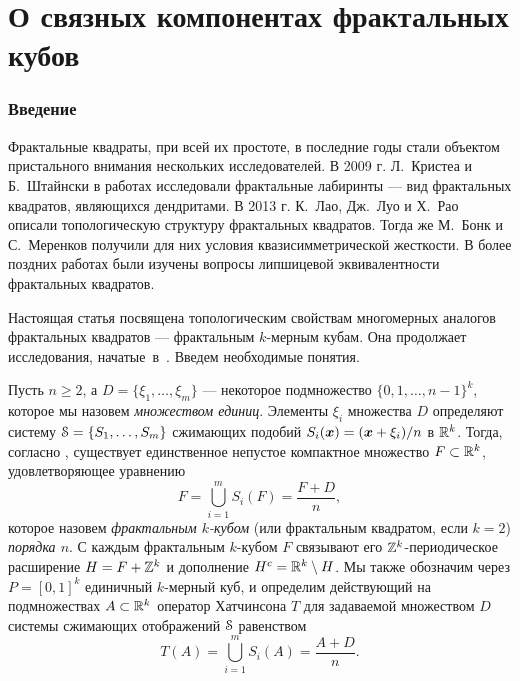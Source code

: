 \part{О связных компонентах фрактальных кубов}

\section{Введение}

Фрактальные квадраты, при всей их простоте, в последние годы стали объектом пристального внимания нескольких исследователей. В 2009 г. Л.~Кристеа и Б.~Штайнски в работах \cite{CS1,CS2} исследовали фрактальные лабиринты  --- вид фрактальных квадратов, являющихся дендритами. В 2013 г. К.~Лао, Дж.~Луо и Х.~Рао \cite{LLR} описали топологическую структуру фрактальных квадратов. Тогда же М.~Бонк и С.~Меренков \cite{BM} получили для них условия квазисимметрической жесткости. В более поздних работах \cite{LL,RW} были изучены вопросы липшицевой эквивалентности фрактальных квадратов.

Настоящая статья посвящена топологическим свойствам многомерных аналогов фрактальных квадратов --- фрактальным $k$-мерным кубам.
Она продолжает исследования, начатые~в~\cite{frcube}.
Введем необходимые понятия.



Пусть $n\geq 2$, а  $ D=\{\xi_1,\ldots,\xi_m\}$ ---  некоторое подмножество  $ \{0,1, \ldots , n-1\}^k$,  которое  мы назовем {\em множеством единиц}. Элементы $\xi_i$ множества $ D$ определяют систему ${\EuScript S}=\{S_1,\ldots,S_m\}$ сжимающих подобий $S_i({\bm{x}})=({\bm{x}}+\xi_i)/n$ в $\mathbb{R}^k$. Тогда, согласно  \cite[Theorem(3), p.10]{Hut}, существует единственное непустое компактное множество $F\subset \mathbb{R}^k$, удовлетворяющее уравнению 
\begin{equation}\label{Feq} 
F=\bigcup\limits_{i=1}^m S_i(F)=\frac{F+ D}{n},
\end{equation}
которое назовем {\em фрактальным $k$-кубом} (или фрактальным квадратом, если $k=2$) {\em порядка $n$}.
С каждым фрактальным $k$-кубом $F$   связывают его $\mathbb{Z}^k$-периодическое расширение
 $H=F+\mathbb{Z}^k$  и   дополнение $H^c=\mathbb{R}^k\setminus H$. Мы также обозначим через $P=[0,1]^k$ единичный $k$-мерный куб, и  определим действующий на  подмножествах  $A\subset \mathbb{R}^k$  оператор Хатчинсона $T$ для задаваемой множеством $ D$ системы сжимающих отображений ${\EuScript S}$  равенством  
\begin{equation}
T(A)=\bigcup\limits_{i=1}^m S_i(A)=\dfrac{A+ D}{n}.
\end{equation}

